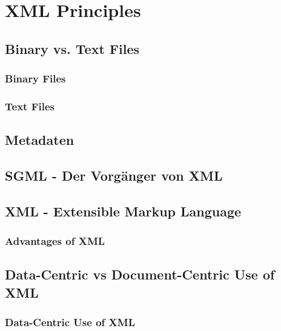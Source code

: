 \documentclass[11pt,DIV=15]{scrreprt}
\begin{document}
	
	

\chapter{XML Principles}

\section{Binary vs. Text Files}

\subsection{Binary Files} 


\subsection{Text Files}


\section{Metadaten}


\section{SGML - Der Vorgänger von XML}


\section{XML - Extensible Markup Language}


\subsection{Advantages of XML}



\section{Data-Centric vs Document-Centric Use of XML}
\subsection{Data-Centric Use of XML}

\end{document}
